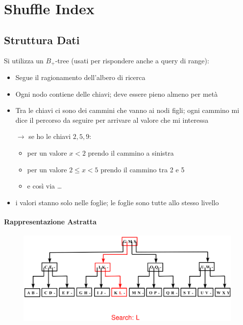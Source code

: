 \documentclass{report}
\begin{document}
\chapter{Shuffle Index}
\section{Struttura Dati}
Si utilizza un $B_+$-tree (usati per rispondere anche a query di range):
\begin{itemize}
    \item Segue il ragionamento dell'albero di ricerca
    \item Ogni nodo contiene delle chiavi; deve essere pieno almeno per metà
    \item Tra le chiavi ci sono dei cammini che vanno ai nodi figli; ogni cammino mi
    dice il percorso da seguire per arrivare al valore che mi interessa

    $\rightarrow$ se ho le chiavi $2, 5, 9$:
    \begin{itemize}
        \item per un valore $x < 2$ prendo il cammino a sinistra
        \item per un valore $2 \leq x < 5$ prendo il cammino tra 2 e 5
        \item e così via \dots 
    \end{itemize}

    \item i valori stanno solo nelle foglie; le foglie sono tutte allo stesso 
    livello 
\end{itemize}

\subsubsection{Rappresentazione Astratta}

\begin{figure}[ht]
    \centering
    \includegraphics[width=0.91\linewidth]{images/b+-tree.png}
\end{figure}
\end{document}
